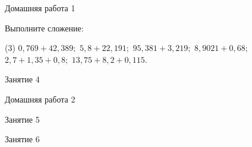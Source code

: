 \begin{homework}[number=1]
	\begin{listofex}
		\item Домашняя работа 1
	\end{listofex}
\end{homework}

\begin{class}[number=3]
	\begin{listofex}
		\item Выполните сложение: \begin{tasks}(3)
			\task \( 0,769 + 42,389; \)
			\task \( 5,8 + 22,191;  \)
			\task \( 95,381 + 3,219; \)
			\task \( 8,9021 + 0,68;  \)
			\task\(  2,7 + 1,35 + 0,8;  \)
			\task\( 13,75 + 8,2 + 0,115. \)
		\end{tasks}
	\end{listofex}
\end{class}

\begin{class}[number=4]
	\begin{listofex}
		\item Занятие 4
	\end{listofex}
\end{class}

\begin{homework}[number=2]
	\begin{listofex}
		\item Домашняя работа 2
	\end{listofex}
\end{homework}

\begin{class}[number=5]
	\begin{listofex}
		\item Занятие 5
	\end{listofex}
\end{class}

\begin{class}[number=6]
	\begin{listofex}
		\item Занятие 6
	\end{listofex}
\end{class}

